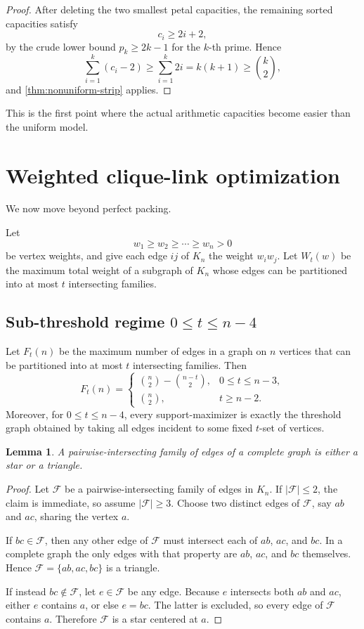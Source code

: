 \documentclass[11pt]{article}
\newtheorem{lemma}[theorem]{Lemma}
\theoremstyle{definition}
\begin{document}
\begin{proof}
After deleting the two smallest petal capacities, the remaining sorted capacities satisfy
\[
c_i\ge 2i+2,
\]
by the crude lower bound \(p_k\ge 2k-1\) for the \(k\)-th prime. Hence
\[
\sum_{i=1}^k(c_i-2)\ge \sum_{i=1}^k 2i = k(k+1)\ge \binom{k}{2},
\]
and \cref{thm:nonuniform-strip} applies.
\end{proof}

This is the first point where the actual arithmetic capacities become easier than the uniform model.

\section{Weighted clique-link optimization}
We now move beyond perfect packing.

Let
\[
w_1\ge w_2\ge \cdots \ge w_n>0
\]
be vertex weights, and give each edge \(ij\) of \(K_n\) the weight \(w_iw_j\). Let \(W_t(w)\) be the maximum total weight of a subgraph of \(K_n\) whose edges can be partitioned into at most \(t\) intersecting families.

\subsection{Sub-threshold regime \(0\le t\le n-4\)}
Let \(F_t(n)\) be the maximum number of edges in a graph on \(n\) vertices that can be partitioned into at most \(t\) intersecting families. Then
\[
F_t(n)=
\begin{cases}
\binom n2-\binom{n-t}{2},& 0\le t\le n-3,\\[6pt]
\binom n2,& t\ge n-2.
\end{cases}
\]
Moreover, for \(0\le t\le n-4\), every support-maximizer is exactly the threshold graph obtained by taking all edges incident to some fixed \(t\)-set of vertices.

\begin{lemma}\label{lem:clique-intersecting-star-triangle}
A pairwise-intersecting family of edges of a complete graph is either a star or a triangle.
\end{lemma}

\begin{proof}
Let \(\mathcal F\) be a pairwise-intersecting family of edges in \(K_n\). If \(|\mathcal F|\le 2\), the claim is immediate, so assume \(|\mathcal F|\ge 3\). Choose two distinct edges of \(\mathcal F\), say \(ab\) and \(ac\), sharing the vertex \(a\).

If \(bc\in \mathcal F\), then any other edge of \(\mathcal F\) must intersect each of \(ab\), \(ac\), and \(bc\). In a complete graph the only edges with that property are \(ab\), \(ac\), and \(bc\) themselves. Hence \(\mathcal F=\{ab,ac,bc\}\) is a triangle.

If instead \(bc\notin \mathcal F\), let \(e\in \mathcal F\) be any edge. Because \(e\) intersects both \(ab\) and \(ac\), either \(e\) contains \(a\), or else \(e=bc\). The latter is excluded, so every edge of \(\mathcal F\) contains \(a\). Therefore \(\mathcal F\) is a star centered at \(a\).
\end{proof}
\end{document}
